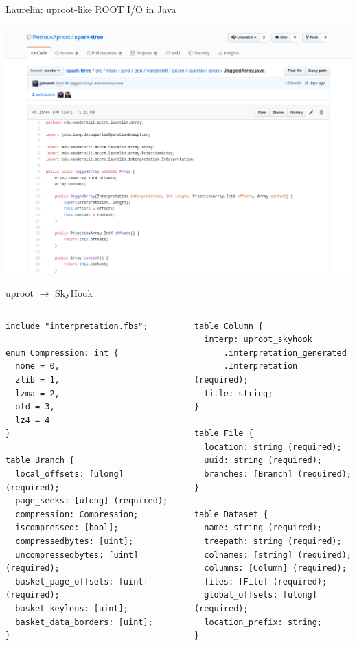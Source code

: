 \documentclass[aspectratio=169]{beamer}
\begin{document}
\begin{frame}{Laurelin: uproot-like ROOT I/O in Java}
\begin{center}
\includegraphics[width=\linewidth]{laurelin-jaggedarray.png}
\end{center}
\end{frame}

\begin{frame}[fragile]{uproot $\to$ SkyHook}
\scriptsize
\begin{columns}[t]
\begin{verbatim}
include "interpretation.fbs";

enum Compression: int {
  none = 0,
  zlib = 1,
  lzma = 2,
  old = 3,
  lz4 = 4
}

table Branch {
  local_offsets: [ulong] (required);
  page_seeks: [ulong] (required);
  compression: Compression;
  iscompressed: [bool];
  compressedbytes: [uint];
  uncompressedbytes: [uint] (required);
  basket_page_offsets: [uint] (required);
  basket_keylens: [uint];
  basket_data_borders: [uint];
}
\end{verbatim}

\begin{verbatim}
table Column {
  interp: uproot_skyhook
      .interpretation_generated
      .Interpretation (required);
  title: string;
}

table File {
  location: string (required);
  uuid: string (required);
  branches: [Branch] (required);
}

table Dataset {
  name: string (required);
  treepath: string (required);
  colnames: [string] (required);
  columns: [Column] (required);
  files: [File] (required);
  global_offsets: [ulong] (required);
  location_prefix: string;
}
\end{verbatim}

\end{columns}
\end{frame}
\end{document}

